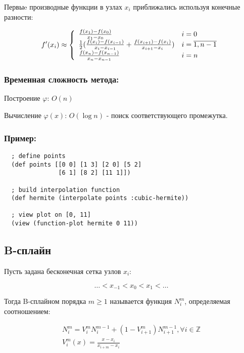 \noindent Первыe производные функции в узлах $x_i$ приближались используя конечные разности:

\begin{equation}
  f'(x_i) \approx \left\{
  \begin{array}{l l}
    \frac{f(x_1) - f(x_0)}{x_1 - x_0} & i = 0 \\
    \frac{1}{2}(\frac{f(x_i) - f(x_{i-1})}{x_i - x_{i-1}} + \frac{f(x_{i+1}) - f(x_i)}{x_{i+1} - x_i}) & i = \overline{1, n-1} \\
    \frac{f(x_n) - f(x_{n-1})}{x_n - x_{n-1}} & i = n
  \end{array}
  \right.
\end{equation}

\subsubsection{Временная сложность метода:}

Построение $\varphi$: $O(n)$

Вычисление $\varphi(x)$: $O(\log n)$ - поиск соответствующего промежутка.

\subsubsection{Пример:}

\begin{verbatim}
  ; define points
  (def points [[0 0] [1 3] [2 0] [5 2]
               [6 1] [8 2] [11 1]])

  ; build interpolation function
  (def hermite (interpolate points :cubic-hermite))

  ; view plot on [0, 11]
  (view (function-plot hermite 0 11))
\end{verbatim}



\subsection{B-сплайн}

Пусть задана бесконечная сетка узлов ${x_i}$:

\[
\ldots < x_{-1} < x_0 < x_1 < \ldots
\]

Тогда B-сплайном порядка $m \geq 1$ называется функция $N^m_i$, определяемая соотношением:

\begin{equation}
  \begin{gathered}
    N^m_i = V^m_i N^{m-1}_i + (1 - V^m_{i+1}) N^{m-1}_{i+1}, \forall i \in \mathbb{Z} \\
    V^m_i(x) = \frac{x - x_i}{x_{i+m} - x_i}
  \end{gathered}
\end{equation}

